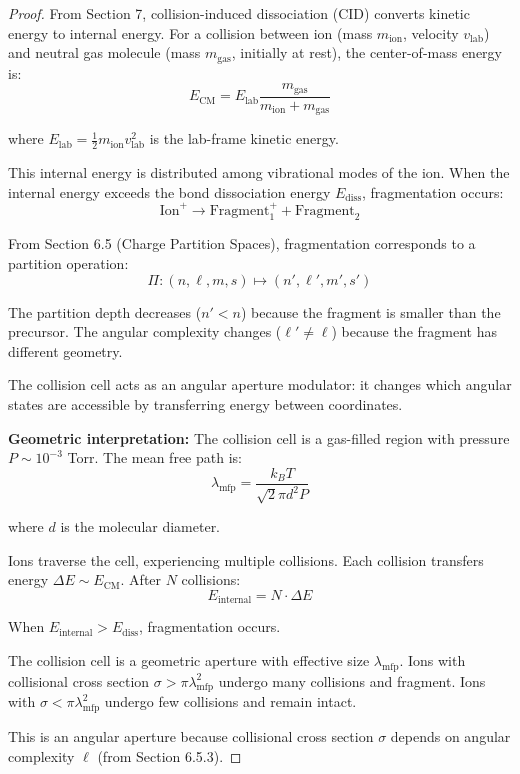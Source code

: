 \begin{proof}
From Section 7, collision-induced dissociation (CID) converts kinetic energy to internal energy. For a collision between ion (mass $m_{\text{ion}}$, velocity $v_{\text{lab}}$) and neutral gas molecule (mass $m_{\text{gas}}$, initially at rest), the center-of-mass energy is:
\begin{equation}
E_{\text{CM}} = E_{\text{lab}} \frac{m_{\text{gas}}}{m_{\text{ion}} + m_{\text{gas}}}
\end{equation}

where $E_{\text{lab}} = \frac{1}{2}m_{\text{ion}}v_{\text{lab}}^2$ is the lab-frame kinetic energy.

This internal energy is distributed among vibrational modes of the ion. When the internal energy exceeds the bond dissociation energy $E_{\text{diss}}$, fragmentation occurs:
\begin{equation}
\text{Ion}^+ \to \text{Fragment}_1^+ + \text{Fragment}_2
\end{equation}

From Section 6.5 (Charge Partition Spaces), fragmentation corresponds to a partition operation:
\begin{equation}
\Pi: (n, \ell, m, s) \mapsto (n', \ell', m', s')
\end{equation}

The partition depth decreases ($n' < n$) because the fragment is smaller than the precursor. The angular complexity changes ($\ell' \neq \ell$) because the fragment has different geometry.

The collision cell acts as an angular aperture modulator: it changes which angular states are accessible by transferring energy between coordinates.

\textbf{Geometric interpretation:} The collision cell is a gas-filled region with pressure $P \sim 10^{-3}$ Torr. The mean free path is:
\begin{equation}
\lambda_{\text{mfp}} = \frac{k_B T}{\sqrt{2}\pi d^2 P}
\end{equation}

where $d$ is the molecular diameter.

Ions traverse the cell, experiencing multiple collisions. Each collision transfers energy $\Delta E \sim E_{\text{CM}}$. After $N$ collisions:
\begin{equation}
E_{\text{internal}} = N \cdot \Delta E
\end{equation}

When $E_{\text{internal}} > E_{\text{diss}}$, fragmentation occurs.

The collision cell is a geometric aperture with effective size $\lambda_{\text{mfp}}$. Ions with collisional cross section $\sigma > \pi\lambda_{\text{mfp}}^2$ undergo many collisions and fragment. Ions with $\sigma < \pi\lambda_{\text{mfp}}^2$ undergo few collisions and remain intact.

This is an angular aperture because collisional cross section $\sigma$ depends on angular complexity $\ell$ (from Section 6.5.3).
\end{proof}

